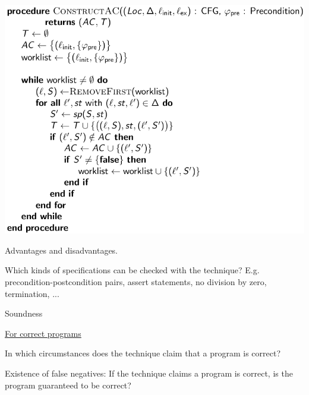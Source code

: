\documentclass[a4paper]{article}
\begin{document}
\begin{minipage}[t]{0.16\linewidth}
\begin{betterlist}
{{				\includegraphics[width=0.7\linewidth]{./figures/bounded_model_checking.png}
			}}
    \item Advantages and disadvantages.
		\item Which kinds of specifications can be checked with the technique? E.g. precondition-postcondition pairs, assert statements, no division by zero, termination, ...

		\item \alert{Soundness}
		\begin{betterlist}
			\item \underline{For correct programs}
			\begin{betterlist}
				\item In which circumstances does the technique claim that a program is correct?

				\item Existence of false negatives: If the technique claims a program is correct, is the program guaranteed to be correct?


\end{betterlist}
\end{betterlist}
\end{betterlist}
\end{minipage}
\end{document}
